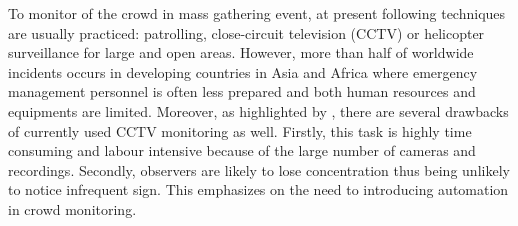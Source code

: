 To monitor of the crowd in mass gathering event, at present following techniques are usually practiced: patrolling, close-circuit television (CCTV) or helicopter surveillance for large and open areas. However, more than half of worldwide incidents occurs in developing countries in Asia and Africa \citep{BurkleJr2011} where emergency management personnel is often less prepared and both human resources and equipments are limited. Moreover, as highlighted by \citet{Davies1995}, there are several drawbacks of currently used CCTV monitoring as well. Firstly, this task is highly time consuming and labour intensive because of the large number of cameras and recordings. Secondly, observers are likely to lose concentration thus being unlikely to notice infrequent sign. This emphasizes on the need to introducing automation in crowd monitoring. 